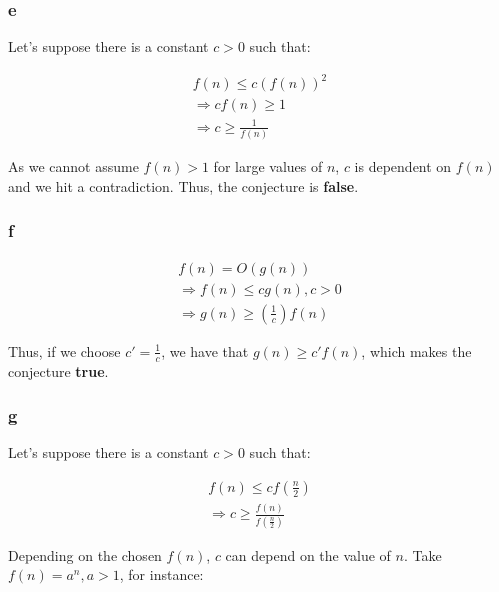 \documentclass[8pt,a4paper]{article}
\begin{document}
\subsubsection*{e}

  Let's suppose there is a constant $c > 0$ such that:

\begin{equation*}
  \begin{split}
    f(n) \leq c(f(n))^{2} \\
    \Rightarrow c f(n) \geq 1 \\
    \Rightarrow c \geq \frac{1}{f(n)}
  \end{split}
\end{equation*}

  As we cannot assume $f(n) > 1$ for large values of $n$, $c$ is dependent on
$f(n)$ and we hit a contradiction. Thus, the conjecture is \textbf{false}.

\subsubsection*{f}

\begin{equation*}
  \begin{split}
    f(n) = O(g(n)) \\
    \Rightarrow f(n) \leq c g(n), c > 0 \\
    \Rightarrow g(n) \geq \left(\frac{1}{c}\right) f(n)
  \end{split}
\end{equation*}

  Thus, if we choose $c' = \frac{1}{c}$, we have that $g(n) \geq c' f(n)$,
which makes the conjecture \textbf{true}.

\subsubsection*{g}

  Let's suppose there is a constant $c > 0$ such that:

\begin{equation*}
  \begin{split}
    f(n) \leq c f\left(\frac{n}{2}\right) \\
    \Rightarrow c \geq \frac{f(n)}{f\left(\frac{n}{2}\right)}
  \end{split}
\end{equation*}

  Depending on the chosen $f(n)$, $c$ can depend on the value of $n$. Take
$f(n) = a^{n}, a > 1$, for instance:
\end{document}
